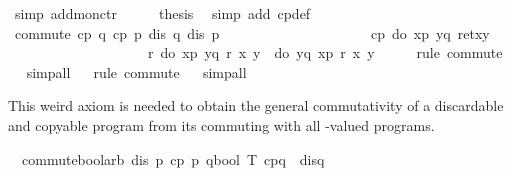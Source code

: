 \begin{isabellebody}
\ {\isacharparenleft}simp\ add{\isacharcolon}mon{\isacharunderscore}ctr{\isacharparenright}\isanewline
\ \ \isamarkupfalse%
\ \isamarkupfalse%
\ {\isacharquery}thesis\ \isamarkupfalse%
\ {\isacharparenleft}simp\ add{\isacharcolon}\ cp{\isacharunderscore}def{\isacharparenright}\isanewline
\isamarkupfalse%
\isanewline
\isanewline
\isanewline
\isamarkupfalse%
\ commute{\isacharunderscore}{}{\isacharunderscore}{}{\isacharcolon}\ {\isachardoublequote}{\isasymlbrakk}cp\ q{\isacharsemicolon}\ cp\ p{\isacharsemicolon}\ dis\ q{\isacharsemicolon}\ dis\ p{\isasymrbrakk}\ {\isasymLongrightarrow}\isanewline
\ \ \ \ \ \ \ \ \ \ \ \ \ \ \ \ \ \ \ \ cp\ {\isacharparenleft}do\ {\isacharbraceleft}x{\isasymleftarrow}p{\isacharsemicolon}\ y{\isasymleftarrow}q{\isacharsemicolon}\ ret{\isacharparenleft}x{\isacharcomma}y{\isacharparenright}{\isacharbraceright}{\isacharparenright}\ {\isasymLongrightarrow}\isanewline
\ \ \ \ \ \ \ \ \ \ \ \ \ \ \ \ \ \ \ \ {\isasymforall}r{\isachardot}\ do\ {\isacharbraceleft}x{\isasymleftarrow}p{\isacharsemicolon}\ y{\isasymleftarrow}q{\isacharsemicolon}\ r\ x\ y{\isacharbraceright}\ {\isacharequal}\ do\ {\isacharbraceleft}y{\isasymleftarrow}q{\isacharsemicolon}\ x{\isasymleftarrow}p{\isacharsemicolon}\ r\ x\ y{\isacharbraceright}{\isachardoublequote}\isanewline
\ \ %
\isanewline
\ \ \isamarkupfalse%
rule\ commute{\isacharunderscore}{}{\isacharunderscore}{}{\isacharparenright}\isanewline
\ \ \isamarkupfalse%
simp{\isacharunderscore}all{\isacharparenright}\isanewline
\ \ \isamarkupfalse%
rule\ commute{\isacharunderscore}{}{\isacharunderscore}{}{\isacharparenright}\isanewline
\ \ \isamarkupfalse%
simp{\isacharunderscore}all{\isacharparenright}\isanewline
\isamarkupfalse%
\isamarkupfalse%
%
\begin{isamarkuptext}%
This weird axiom is needed to obtain the general commutativity of 
  a discardable and copyable program from its commuting  with all 
  -valued programs.
  \label{isa:commute-bool-arb}%
\end{isamarkuptext}%
\isamarkuptrue%
\isanewline
\ \ commute{\isacharunderscore}bool{\isacharunderscore}arb{\isacharcolon}\ {\isachardoublequote}{\isasymlbrakk}dis\ p{\isacharsemicolon}\ cp\ p{\isacharsemicolon}\ {\isasymforall}q{}{\isacharcolon}{\isacharcolon}bool\ T{\isachardot}\ cp{\isacharparenleft}q{}{\isacharparenright}\ {\isasymand}\ dis{\isacharparenleft}q{}{\isacharparenright}\ {\isasymlongrightarrow}\ \isanewline

\end{isabellebody}

